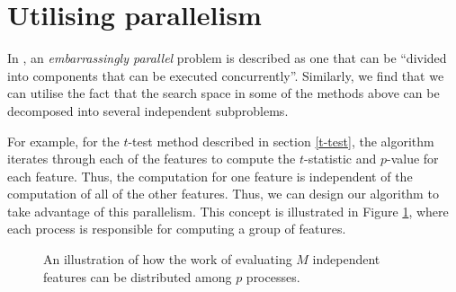 \documentclass[12pt, twoside, a4paper]{report}
\begin{document}
\section{Utilising parallelism} \label{body:parallel}

In \cite{RefWorks:221}, an \textit{embarrassingly parallel} problem is described as one that can be ``divided into components that can be executed concurrently''. Similarly, we find that we can utilise the fact that the search space in some of the methods above can be decomposed into several independent subproblems.

For example, for the $t$-test method described in section \ref{t-test}, the algorithm iterates through each of the features to compute the $t$-statistic and $p$-value for each feature. Thus, the computation for one feature is independent of the computation of all of the other features. Thus, we can design our algorithm to take advantage of this parallelism. This concept is illustrated in Figure \ref{body:parallelism_diag}, where each process is responsible for computing a group of features.

\begin{figure}
\centering
{}
\caption{An illustration of how the work of evaluating $M$ independent features can be distributed among $p$ processes.}
\label{body:parallelism_diag}
\end{figure}
\end{document}
